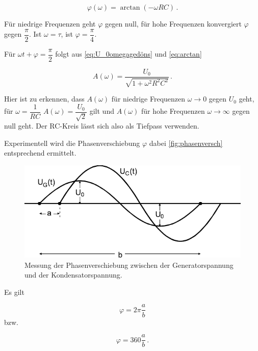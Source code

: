 \begin{equation}
    \varphi (ω) = \arctan(-ω R C) \,.
    \label{eq:arctan}
\end{equation}

Für niedrige Frequenzen geht $\varphi$ gegen null, für hohe Frequenzen konvergiert $\varphi$ gegen $\dfrac{\pi}{2}$.
Ist $\omega = \tau$, ist $\varphi = \dfrac{\pi}{4}$.

Für $\omega t + \varphi  = \dfrac{\pi}{2}$ folgt aus \eqref{eq:U_0omegagedöns} und \eqref{eq:arctan}

\begin{equation}
    A(\omega) = \frac{U_0}{\sqrt{1 + \omega^2 R^2 C^2}} \,.
    \label{eq:amplitudendingens}
\end{equation}

Hier ist zu erkennen, dass $A(\omega)$ für niedrige Frequenzen $\omega \rightarrow 0$ gegen $U_0$ geht, für $\omega = \dfrac{1}{RC}$ $A(\omega) = \dfrac{U_0}{\sqrt{2}}$ gilt und $A(\omega)$ für hohe Frequenzen $\omega \rightarrow \infty$ gegen null geht.
Der RC-Kreis lässt sich also als Tiefpass verwenden.

Experimentell wird die Phasenverschiebung $\varphi$ dabei \autoref{fig:phasenversch} entsprechend ermittelt.

\begin{figure}
    \centering
    \includegraphics{figures/Phasenverschiebung.pdf}
    \caption{Messung der Phasenverschiebung zwischen der Generatorspannung und der Kondensatorspannung\cite{ap08}.}
    \label{fig:phasenversch}
\end{figure}
Es gilt

\begin{equation*}
    \varphi = 2 \pi \frac{a}{b} 
    \label{eq:phasebogen}
\end{equation*} bzw.

\begin{equation*}
    \varphi = 360 \frac{a}{b} \,.
    \label{eq:phasegrad}
\end{equation*}

